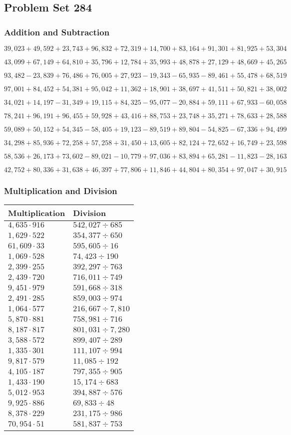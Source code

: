 \hypertarget{problem-set-284}{%
\subsection{Problem Set 284}\label{problem-set-284}}

\hypertarget{addition-and-subtraction}{%
\subsubsection{Addition and
Subtraction}\label{addition-and-subtraction}}

\(39,023+49,592+23,743+96,832+72,319+14,700+83,164+91,301+81,925+53,304\)

\(43,099+67,149+64,810+35,796+12,784+35,993+48,878+27,129+48,669+45,265\)

\(93,482-23,839+76,486+76,005+27,923-19,343-65,935-89,461+55,478+68,519\)

\(97,001+84,452+54,381+95,042+11,362+18,901+38,697+41,511+50,821+38,002\)

\(34,021+14,197-31,349+19,115+84,325-95,077-20,884+59,111+67,933-60,058\)

\(78,241+96,191+96,455+59,928+43,416+88,753+23,748+35,271+78,633+28,588\)

\(59,089+50,152+54,345-58,405+19,123-89,519+89,804-54,825-67,336+94,499\)

\(34,298+85,936+72,258+57,258+31,450+13,605+82,124+72,652+16,749+23,598\)

\(58,536+26,173+73,602-89,021-10,779+97,036+83,894+65,281-11,823-28,163\)

\(42,752+80,336+31,638+46,397+77,806+11,846+44,804+80,354+97,047+30,915\)

\hypertarget{multiplication-and-division}{%
\subsubsection{Multiplication and
Division}\label{multiplication-and-division}}

\begin{longtable}[]{@{}ll@{}}
\toprule
Multiplication & Division\tabularnewline
\midrule
\endhead
\(4,635\cdot916\) & \(542,027÷685\)\tabularnewline
\(1,629\cdot522\) & \(354,377÷650\)\tabularnewline
\(61,609\cdot33\) & \(595,605÷16\)\tabularnewline
\(1,069\cdot528\) & \(74,423÷190\)\tabularnewline
\(2,399\cdot255\) & \(392,297÷763\)\tabularnewline
\(2,439\cdot720\) & \(716,011÷749\)\tabularnewline
\(9,451\cdot979\) & \(591,668÷318\)\tabularnewline
\(2,491\cdot285\) & \(859,003÷974\)\tabularnewline
\(1,064\cdot577\) & \(216,667÷7,810\)\tabularnewline
\(5,870\cdot881\) & \(758,981÷716\)\tabularnewline
\(8,187\cdot817\) & \(801,031÷7,280\)\tabularnewline
\(3,588\cdot572\) & \(899,407÷289\)\tabularnewline
\(1,335\cdot301\) & \(111,107÷994\)\tabularnewline
\(9,817\cdot579\) & \(11,085÷192\)\tabularnewline
\(4,105\cdot187\) & \(797,355÷905\)\tabularnewline
\(1,433\cdot190\) & \(15,174÷683\)\tabularnewline
\(5,012\cdot953\) & \(394,887÷576\)\tabularnewline
\(9,925\cdot886\) & \(69,833÷48\)\tabularnewline
\(8,378\cdot229\) & \(231,175÷986\)\tabularnewline
\(70,954\cdot51\) & \(581,837÷753\)\tabularnewline
\bottomrule
\end{longtable}
